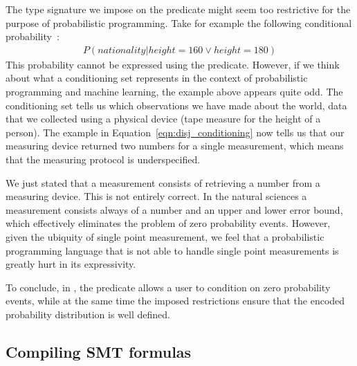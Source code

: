 The type signature we impose on the  predicate might seem too restrictive for the purpose of probabilistic programming. Take for example the following conditional probability~\citep{nitti2016probabilistic}:
\begin{align}
	P(nationality| height {=} 160 \lor height {=} 180) \label{eqn:disj_conditioning}
\end{align}
This probability cannot be expressed using the  predicate. However, if we think about what a conditioning set represents in the context of probabilistic programming and machine learning, the example above appears quite odd. The conditioning set tells us which observations we have made about the world, \ie data that we collected using a physical device (\eg tape measure for the height of a person). The example in Equation~\ref{eqn:disj_conditioning} now tells us that our measuring device returned two numbers for a single measurement, which means that the measuring protocol is underspecified.

We just stated that a measurement consists of retrieving a number from a measuring device. This is not entirely correct. In the natural sciences a measurement consists always of a number and an upper and lower error bound, which effectively eliminates the problem of zero probability events. However, given the ubiquity of single point measurement, we feel that a probabilistic programming language that is not able to handle single point measurements is greatly hurt in its expressivity.

To conclude, in \dcproblogsty,  the  predicate allows a user to condition on zero probability events, while at the same time the imposed restrictions ensure that the encoded probability distribution is well defined.








\subsection{Compiling SMT formulas}

